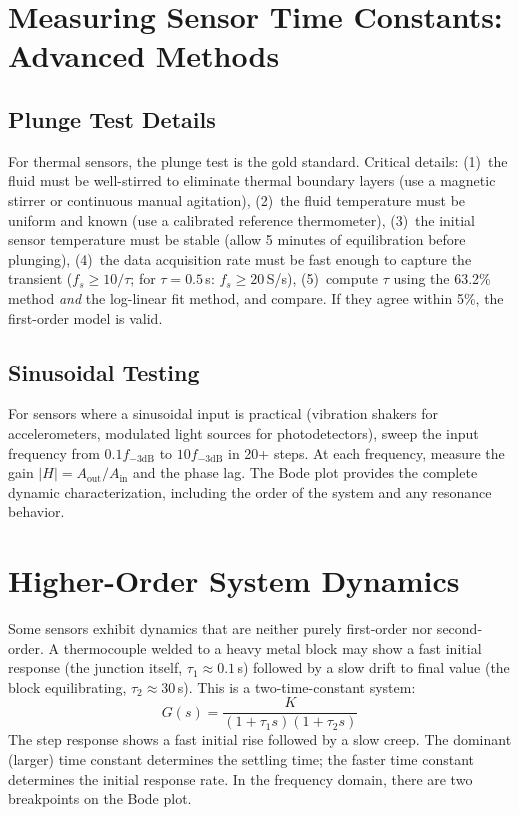 \documentclass[11pt,letterpaper,twoside,openany]{book}
\begin{document}
\section{Measuring Sensor Time Constants: Advanced Methods}
\subsection{Plunge Test Details}
For thermal sensors, the plunge test is the gold standard. Critical details: (1)~the fluid must be well-stirred to eliminate thermal boundary layers (use a magnetic stirrer or continuous manual agitation), (2)~the fluid temperature must be uniform and known (use a calibrated reference thermometer), (3)~the initial sensor temperature must be stable (allow 5 minutes of equilibration before plunging), (4)~the data acquisition rate must be fast enough to capture the transient ($f_s \geq 10/\tau$; for $\tau = 0.5$\,s: $f_s \geq 20$\,S/s), (5)~compute $\tau$ using the 63.2\% method \emph{and} the log-linear fit method, and compare. If they agree within 5\%, the first-order model is valid.

\subsection{Sinusoidal Testing}
For sensors where a sinusoidal input is practical (vibration shakers for accelerometers, modulated light sources for photodetectors), sweep the input frequency from $0.1 f_{-3\text{dB}}$ to $10 f_{-3\text{dB}}$ in 20+ steps. At each frequency, measure the gain $|H| = A_{\text{out}}/A_{\text{in}}$ and the phase lag. The Bode plot provides the complete dynamic characterization, including the order of the system and any resonance behavior.

\section{Higher-Order System Dynamics}
Some sensors exhibit dynamics that are neither purely first-order nor second-order. A thermocouple welded to a heavy metal block may show a fast initial response (the junction itself, $\tau_1 \approx 0.1$\,s) followed by a slow drift to final value (the block equilibrating, $\tau_2 \approx 30$\,s). This is a two-time-constant system:
\begin{equation}
G(s) = \frac{K}{(1 + \tau_1 s)(1 + \tau_2 s)}
\end{equation}
The step response shows a fast initial rise followed by a slow creep. The dominant (larger) time constant determines the settling time; the faster time constant determines the initial response rate. In the frequency domain, there are two breakpoints on the Bode plot.
\end{document}
